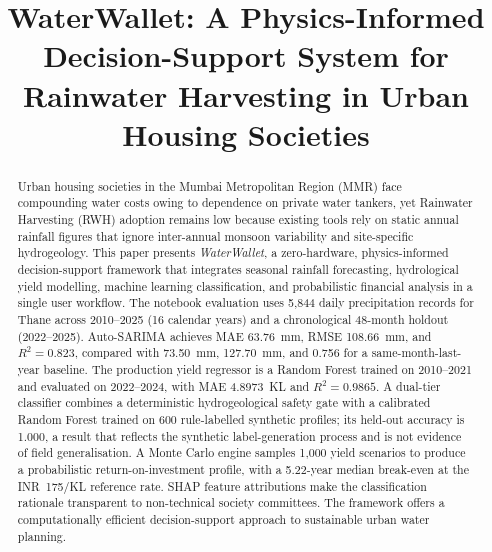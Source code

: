 ﻿\documentclass[conference]{IEEEtran}
\begin{document}
\title{WaterWallet: A Physics-Informed Decision-Support System for\\ Rainwater Harvesting in Urban Housing Societies}

\author{
}

\maketitle

\begin{abstract}
Urban housing societies in the Mumbai Metropolitan Region (MMR) face compounding water costs owing to dependence on private water tankers, yet Rainwater Harvesting (RWH) adoption remains low because existing tools rely on static annual rainfall figures that ignore inter-annual monsoon variability and site-specific hydrogeology. This paper presents \textit{WaterWallet}, a zero-hardware, physics-informed decision-support framework that integrates seasonal rainfall forecasting, hydrological yield modelling, machine learning classification, and probabilistic financial analysis in a single user workflow. The notebook evaluation uses 5,844 daily precipitation records for Thane across 2010--2025 (16 calendar years) and a chronological 48-month holdout (2022--2025). Auto-SARIMA achieves MAE 63.76~mm, RMSE 108.66~mm, and $R^2=0.823$, compared with 73.50~mm, 127.70~mm, and 0.756 for a same-month-last-year baseline. The production yield regressor is a Random Forest trained on 2010--2021 and evaluated on 2022--2024, with MAE 4.8973~KL and $R^2=0.9865$. A dual-tier classifier combines a deterministic hydrogeological safety gate with a calibrated Random Forest trained on 600 rule-labelled synthetic profiles; its held-out accuracy is 1.000, a result that reflects the synthetic label-generation process and is not evidence of field generalisation. A Monte Carlo engine samples 1,000 yield scenarios to produce a probabilistic return-on-investment profile, with a 5.22-year median break-even at the INR~175/KL reference rate. SHAP feature attributions make the classification rationale transparent to non-technical society committees. The framework offers a computationally efficient decision-support approach to sustainable urban water planning.
\end{abstract}
\end{document}
